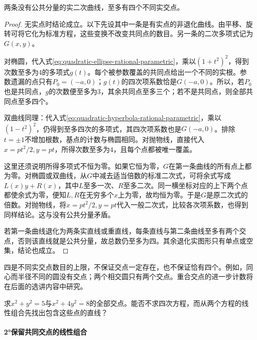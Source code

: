 \begin{theorem}\label{thm:quadratic-four-intersections}
两条没有公共分量的实二次曲线，至多有四个不同实交点。
\end{theorem}

\begin{proof}
无实点时结论成立。以下先设其中一条是有实点的非退化曲线。由平移、旋转可将它化为标准方程，这些变换不改变共同点的数目。另一条的二次多项式记为\(G(x,y)\)。

对椭圆，代入式\eqref{eq:quadratic-ellipse-rational-parametric}，乘以\((1+t^2)^2\)，得到次数至多为\(4\)的多项式\(g(t)\)。每个被参数覆盖的共同点给出一个不同的实根。参数遗漏的点只有\(P_0=(-a,0)\)；\(g(t)\)的四次项系数恰是\(G(-a,0)\)。所以，若\(P_0\)也是共同点，\(g\)的次数便至多为\(3\)，其余共同点至多三个；若不是共同点，则全部共同点至多四个。

双曲线同理：代入式\eqref{eq:quadratic-hyperbola-rational-parametric}，乘以\((1-t^2)^2\)，仍得到至多四次的多项式，其四次项系数也是\(G(-a,0)\)。排除\(t=\pm1\)不增加根数，基点的计数与椭圆相同。对抛物线，直接代入\(x=pt^2/2,y=pt\)，所得次数至多为\(4\)，且每个点都被唯一覆盖。

这里还须说明所得多项式不恒为零。如果它恒为零，\(G\)在第一条曲线的所有点上都为零。对椭圆或双曲线，从\(G\)中减去适当倍数的标准二次式，可将余式写成\(L(x)y+R(x)\)，其中\(L\)至多一次、\(R\)至多二次。同一横坐标对应的上下两个点都使余式为零，便知\(L,R\)在无穷多个\(x\)上为零，故均恒为零。于是\(G\)是原二次式的倍数。对抛物线，将\(x=pt^2/2,y=pt\)代入一般二次式，比较各次项系数，也得到同样结论。这与没有公共分量矛盾。

若第一条曲线退化为两条实直线或重直线，每条直线与第二条曲线至多有两个交点，否则该直线就是公共分量，故总数仍至多为四。其余退化实图形只有单点或空集，结论也成立。
\end{proof}

四是不同实交点数目的上限，不保证交点一定存在，也不保证恰有四个。例如，同心而半径不同的圆没有交点；两个相交圆只有两个交点。重合交点的进一步计数将在后面的选讲内容中研究。

\par\noindent\begin{minipage}{\linewidth}
\begin{example}
求\(x^2+y^2=5\)与\(x^2+4y^2=8\)的全部交点。能否不求四次方程，而从两个方程的线性组合先找出包含这些点的直线？
\end{example}
\end{minipage}\par


\endgroup
\newpage
\paragraph{2°保留共同交点的线性组合} \mbox{}

